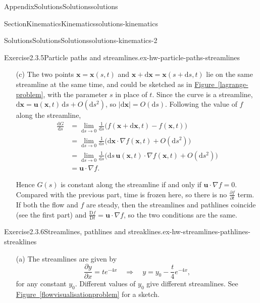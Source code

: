 \documentclass[oneside,10pt,]{book}
\newcommand{\xreffont}{\relax}
\numberwithin{equation}{section}
\newcommand{\de}{\mathrm{d}}
\newcommand{\dd}[2]{\frac{\de#1}{\de#2}}
\newcommand{\DD}[2]{\frac{\mathrm{D}#1}{\mathrm{D}#2}}
\newcommand{\pd}[2]{\frac{\partial#1}{\partial#2}}
\newcommand{\bx}{\boldsymbol{x}}
\newcommand{\bu}{\boldsymbol{u}}
\begin{document}
\begin{appendixptx}{Appendix}{Solutions}{}{Solutions}{}{}{solutions}
\begin{sectionptx}{Section}{Kinematics}{}{Kinematics}{}{}{solutions-kinematics}
\begin{solutions-subsection-numberless}{Solutions}{Solutions}{}{Solutions}{}{}{solutions-kinematics-2}
\begin{divisionsolution}{Exercise}{2.3.5}{Particle paths and streamlines.}{ex-hw-particle-paths-streamlines}
\begin{enumerate}[font=\bfseries,label=(\alph*),ref=\alph*]
\begin{align*}
&= \pd{f}{t} + \bu \cdot \nabla f = \DD{f}{t}.
\end{align*}
%
\par
The value of \(f\) carried by the particle, \(F(t)\), is constant for all \(t\) if and only if \(\dd{F}{t} = 0\). Since this holds for every pathline, \(f\) is preserved following the flow if and only if \(\DD{f}{t} = 0\).%
\item[(c)]\noindent\hypertarget{ex-hw-particle-paths-streamlines-5-3-main}{}The two points \(\bx = \bx(s, t)\) and \(\bx + \de\bx = \bx(s + \de s, t)\) lie on the same streamline at the same time, and could be sketched as in \hyperref[lagrange-problem]{Figure~{\xreffont\ref{lagrange-problem}}}, with the parameter \(s\) in place of \(t\). Since the curve is a streamline, \(\de\bx = \bu(\bx, t) \, \de s + O(\de s^2)\), so \(|\de\bx|
= O(\de s)\). Following the value of \(f\) along the streamline,%
\begin{align*}
\dd{G}{s} &= \lim_{\de s \to 0} \frac{1}{\de s} \Big( f(\bx + \de\bx, t) -
f(\bx, t) \Big)\\
&= \lim_{\de s \to 0} \frac{1}{\de s} \Big( \de\bx \cdot \nabla f(\bx, t) +
O(\de s^2) \Big)\\
&= \lim_{\de s \to 0} \frac{1}{\de s} \Big( \de s \, \bu(\bx, t) \cdot \nabla
f(\bx, t) + O(\de s^2) \Big)\\
&= \bu \cdot \nabla f.
\end{align*}
%
\par
Hence \(G(s)\) is constant along the streamline if and only if \(\bu \cdot \nabla
f = 0\). Compared with the previous part, time is frozen here, so there is no \(\pd{f}{t}\) term. If both the flow and \(f\) are steady, then the streamlines and pathlines coincide (see the first part) and \(\DD{f}{t} = \bu \cdot \nabla f\), so the two conditions are the same.%
\end{enumerate}%
\end{divisionsolution}%
\begin{divisionsolution}{Exercise}{2.3.6}{Streamlines, pathlines and streaklines.}{ex-hw-streamlines-pathlines-streaklines}%
\begin{enumerate}[font=\bfseries,label=(\alph*),ref=\alph*]%
\item[(a)]\noindent\hypertarget{ex-hw-streamlines-pathlines-streaklines-3-2-main}{}The streamlines are given by%
\begin{equation*}
\pd{y}{x}=te^{-4x}\quad\Rightarrow\quad
y=y_0-\frac{t}{4} e^{-4x},
\end{equation*}
for any constant \(y_0\). Different values of \(y_0\) give different streamlines. See \hyperref[flowvisualisationproblem]{Figure~{\xreffont\ref{flowvisualisationproblem}}} for a sketch.%

\end{enumerate}
\end{divisionsolution}
\end{solutions-subsection-numberless}
\end{sectionptx}
\end{appendixptx}
\end{document}
